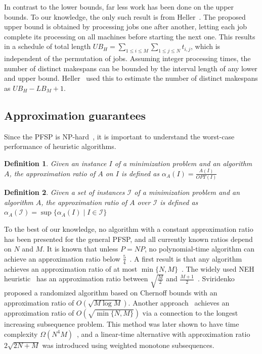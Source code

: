 \documentclass{article}
\theoremstyle{thmstyleone}%
\theoremstyle{thmstyletwo}%
\theoremstyle{thmstylethree}%
\newtheorem{definition}{Definition}%
\begin{document}
In contrast to the lower bounds, far less work has been done on the upper bounds. To our knowledge, the only such result is from Heller~\cite{Heller}. 
The proposed upper bound is obtained by processing jobs one after another, letting each job complete its processing on all machines before starting the next one. This results in a schedule of total length $UB_H=\sum_{1 \leq i \leq M} \sum_{1 \leq j \leq N} t_{i,j}$, which is independent of the permutation of jobs.
Assuming integer processing times, the number of distinct makespans can be bounded by the interval length of any lower and upper bound. 
Heller~\cite{Heller} used this to estimate the number of distinct makespans as $UB_H - LB_M + 1$. 

\subsection{Approximation guarantees}

Since the PFSP is NP-hard~\cite{NPHard}, it is important to understand the worst-case performance of heuristic algorithms. 

\begin{definition}
Given an instance $I$ of a minimization problem and an algorithm $A$, the \textit{approximation ratio} of $A$ on $I$ is defined as $\alpha_A(I) = \frac{ A(I) }{ OPT(I) }$
\end{definition}

\begin{definition}
Given a set of instances $\mathcal{I}$ of a minimization problem and an algorithm $A$, the approximation ratio of $A$ over $\mathcal{I}$ is defined as $\alpha_A( \mathcal{I} ) = \sup \{ \alpha_A(I) \mid I \in \mathcal{I} \}$
\end{definition}

To the best of our knowledge, no algorithm with a constant approximation ratio has been presented for the general PFSP, and all currently known ratios depend on $N$ and $M$.  
It is known that unless $P = NP$, no polynomial-time algorithm can achieve an approximation ratio below $\frac{5}{4}$~\cite{WilliamsonApprox}. 
A first result is that any algorithm achieves an approximation ratio of at most $\min\{N, M\}$~\cite{pinedo-2022}. 
The widely used NEH heuristic~\cite{NEH} has an approximation ratio between $\sqrt{\frac{M}{2}}$ and $\frac{M + 1}{2}$~\cite{NEHApprox}. 
Sviridenko~\cite{SviridenkoApprox} proposed a randomized algorithm based on Chernoff bounds with an approximation ratio of $O(\sqrt{M \log M})$. Another approach~\cite{SqrtMinNM-Approx} achieves an approximation ratio of $O(\sqrt{\min\{N, M\}})$ via a connection to the longest increasing subsequence problem. 
This method was later shown to have time complexity $\Omega(N^4 M)$~\cite{LinearApprox}, and a linear-time alternative with approximation ratio $2\sqrt{2N + M}$ was introduced using weighted monotone subsequences. 
\end{document}
